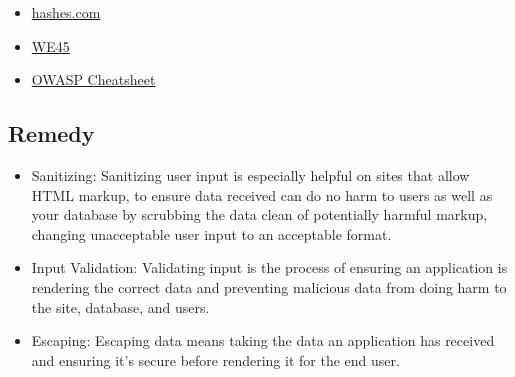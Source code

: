 \begin{itemize}
    \item \href{https://hashes.com/en/tools/base64encode}{hashes.com}
    \item \href{https://www.we45.com/blog/preventing-xss-with-base64-encoding-the-false-sense-of-web-application-security}{WE45}
    \item \href{https://github.com/OWASP/CheatSheetSeries/blob/master/cheatsheets/Cross_Site_Scripting_Prevention_Cheat_Sheet.md}{OWASP Cheatsheet}
\end{itemize}

\subsection{Remedy}

\begin{itemize}
    \item Sanitizing: Sanitizing user input is especially helpful on sites that allow HTML markup, to ensure data received can do no harm to users as well as your database by scrubbing the data clean of potentially harmful markup, changing unacceptable user input to an acceptable format.
    
    \item Input Validation: Validating input is the process of ensuring an application is rendering the correct data and preventing malicious data from doing harm to the site, database, and users.
    
    \item Escaping: Escaping data means taking the data an application has received and ensuring it’s secure before rendering it for the end user.
    
\end{itemize}